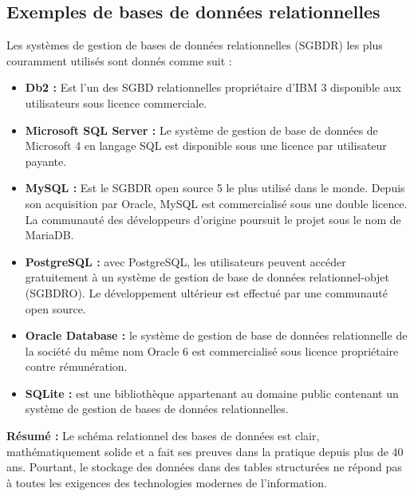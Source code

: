 \subsection{Exemples de bases de données relationnelles}
Les systèmes de gestion de bases de données relationnelles (SGBDR) les plus couramment utilisés sont donnés comme suit :

\begin{itemize}[label=\textbullet]
\item \textbf{Db2 :} Est l'un des SGBD relationnelles propriétaire d'IBM 3 disponible aux utilisateurs sous licence commerciale.
\item \textbf{Microsoft SQL Server :} Le système de gestion de base de données de Microsoft 4 en langage SQL est disponible sous une licence par utilisateur payante.
\item \textbf{MySQL :} Est le SGBDR open source 5 le plus utilisé dans le monde. Depuis son acquisition par Oracle, MySQL est commercialisé sous une double licence. La communauté des développeurs d'origine poursuit le projet sous le nom de MariaDB.
\item \textbf{PostgreSQL :} avec PostgreSQL, les utilisateurs peuvent accéder gratuitement à un système de gestion de base de données relationnel-objet (SGBDRO). Le développement ultérieur est effectué par une communauté open source.
\item \textbf{Oracle Database :} le système de gestion de base de données relationnelle de la société du même nom Oracle 6 est commercialisé sous licence propriétaire contre rémunération.
\item \textbf{SQLite :} est une bibliothèque appartenant au domaine public contenant un système de gestion de bases de données relationnelles.
\end{itemize}

\textbf{Résumé :} Le schéma relationnel des bases de données est clair, mathématiquement solide et a fait ses preuves dans la pratique depuis plus de 40 ans. Pourtant, le stockage des données dans des tables structurées ne répond pas à toutes les exigences des technologies modernes de l'information.